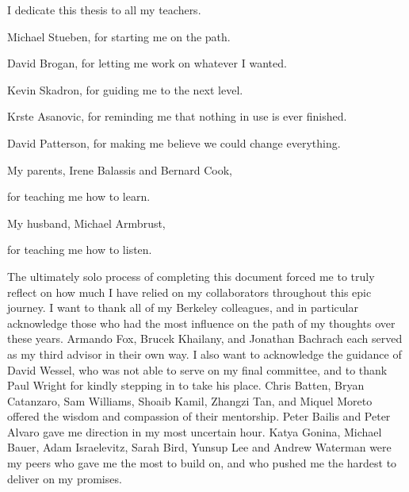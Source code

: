 \documentclass[12pt]{myucthesis}
\begin{document}
\hypersetup{pageanchor=true}
\begin{frontmatter}

\begin{dedication}
\null\vfil
{\large
\begin{center}
I dedicate this thesis to all my teachers.
\vspace{1in}

Michael Stueben, for starting me on the path.

David Brogan, for letting me work on whatever I wanted.

Kevin Skadron, for guiding me to the next level.

Krste Asanovic, for reminding me that nothing in use is ever finished.

David Patterson, for making me believe we could change everything.
\vspace{1in}

My parents, Irene Balassis and Bernard Cook,

for teaching me how to learn.
\vspace{1in}

My husband, Michael Armbrust,

for teaching me how to listen.

\end{center}}
\null\vfil
\end{dedication}

\tableofcontents
\listoffigures %
\listoftables %


\begin{acknowledgements}

The ultimately solo process of completing this document forced me to truly reflect
on how much I have relied on my collaborators throughout this epic journey.
I want to thank all of my Berkeley colleagues, and in particular acknowledge
those who had the most influence on the path of my thoughts over these years.
Armando Fox, Brucek Khailany, and Jonathan Bachrach each served as my third advisor in their own way.
I also want to acknowledge the guidance of David Wessel, who was not able to serve on my final committee,
and to thank Paul Wright for kindly stepping in to take his place.
Chris Batten, Bryan Catanzaro, Sam Williams, Shoaib Kamil, Zhangzi Tan, and Miquel Moreto
offered the wisdom and compassion of their mentorship.
Peter Bailis and Peter Alvaro gave me direction in my most uncertain hour.
Katya Gonina, Michael Bauer, Adam Israelevitz,
Sarah Bird, Yunsup Lee and Andrew Waterman
were my peers who gave me the most to build on,
and who pushed me the hardest to deliver on my promises.


\end{acknowledgements}
\end{frontmatter}
\end{document}
